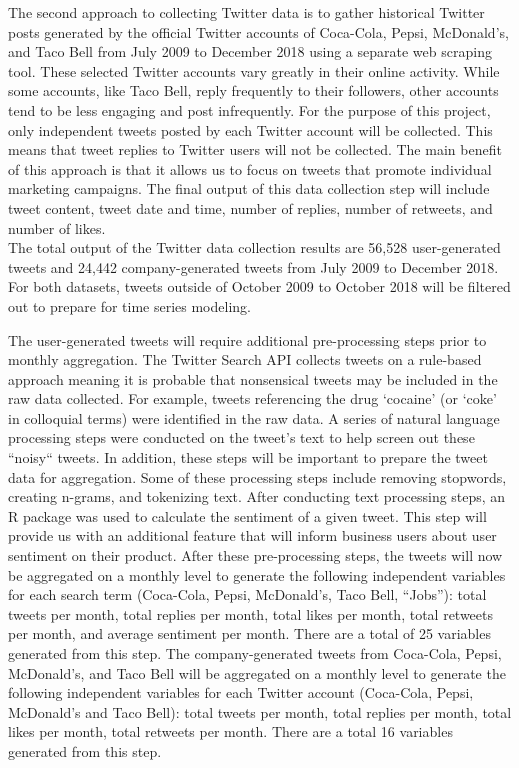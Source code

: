 \documentclass[12pt,oneside]{chicagocapstone}
\begin{document}
The second approach to collecting Twitter data is to gather historical Twitter posts generated by the official Twitter accounts of Coca-Cola, Pepsi, McDonald's, and Taco Bell from July 2009 to December 2018 using a separate web scraping tool. These selected Twitter accounts vary greatly in their online activity. While some accounts, like Taco Bell, reply frequently to their followers, other accounts tend to be less engaging and post infrequently. For the purpose of this project, only independent tweets posted by each Twitter account will be collected. This means that tweet replies to Twitter users will not be collected. The main benefit of this approach is that it allows us to focus on tweets that promote individual marketing campaigns. The final output of this data collection step will include tweet content, tweet date and time, number of replies, number of retweets, and number of likes.\\
The total output of the Twitter data collection results are 56,528 user-generated tweets and 24,442 company-generated tweets from July 2009 to December 2018. For both datasets, tweets outside of October 2009 to October 2018 will be filtered out to prepare for time series modeling.

The user-generated tweets will require additional pre-processing steps prior to monthly aggregation. The Twitter Search API collects tweets on a rule-based approach meaning it is probable that nonsensical tweets may be included in the raw data collected. For example, tweets referencing the drug `cocaine' (or `coke' in colloquial terms) were identified in the raw data. A series of natural language processing steps were conducted on the tweet's text to help screen out these ``noisy`` tweets. In addition, these steps will be important to prepare the tweet data for aggregation. Some of these processing steps include removing stopwords, creating n-grams, and tokenizing text. After conducting text processing steps, an R package was used to calculate the sentiment of a given tweet. This step will provide us with an additional feature that will inform business users about user sentiment on their product. After these pre-processing steps, the tweets will now be aggregated on a monthly level to generate the following independent variables for each search term (Coca-Cola, Pepsi, McDonald's, Taco Bell, ``Jobs''): total tweets per month, total replies per month, total likes per month, total retweets per month, and average sentiment per month. There are a total of 25 variables generated from this step.
The company-generated tweets from Coca-Cola, Pepsi, McDonald's, and Taco Bell will be aggregated on a monthly level to generate the following independent variables for each Twitter account (Coca-Cola, Pepsi, McDonald's and Taco Bell): total tweets per month, total replies per month, total likes per month, total retweets per month. There are a total 16 variables generated from this step.
\end{document}
